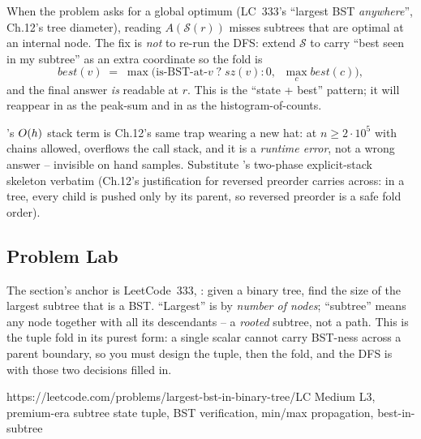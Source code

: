 \begin{warningbox}
When the problem asks for a global optimum (LC~333's ``largest BST
\emph{anywhere}'', Ch.12's tree diameter), reading $A(\mathcal S(r))$ misses
subtrees that are optimal at an internal node. The fix is \emph{not} to
re-run the DFS: extend $\mathcal S$ to carry ``best seen in my subtree'' as
an extra coordinate so the fold is
\[
  \mathit{best}(v) \;=\; \max\!\big(\text{is-BST-at-}v \;?\; \mathit{sz}(v):0,\;\;\max_c \mathit{best}(c)\big),
\]
and the final answer \emph{is} readable at $r$. This is the ``state + best''
pattern; it will reappear in  as the peak-sum and in
 as the histogram-of-counts.
\end{warningbox}

\begin{warningbox}
's $O(h)$ stack term is Ch.12's same trap
wearing a new hat: at $n\ge 2\cdot 10^{5}$ with chains allowed,
 overflows the call stack, and it is a \emph{runtime
error}, not a wrong answer -- invisible on hand samples. Substitute
's two-phase explicit-stack skeleton verbatim (Ch.12's
justification for reversed preorder carries across: in a tree, every child
is pushed only by its parent, so reversed preorder is a safe fold order).
\end{warningbox}

\subsection{Problem Lab}

The section's anchor is LeetCode~333, : given a
binary tree, find the size of the largest subtree that is a BST. ``Largest''
is by \emph{number of nodes}; ``subtree'' means any node together with all
its descendants -- a \emph{rooted} subtree, not a path. This is the tuple
fold in its purest form: a single scalar cannot carry BST-ness across a
parent boundary, so you must design the tuple, then the fold, and the DFS is
 with those two decisions filled in.

  {https://leetcode.com/problems/largest-bst-in-binary-tree/}{LC Medium L3, premium-era}
  {subtree state tuple, BST verification, min/max propagation, best-in-subtree}

